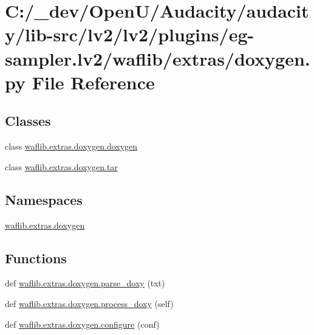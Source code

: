 \hypertarget{lv2_2plugins_2eg-sampler_8lv2_2waflib_2extras_2doxygen_8py}{}\section{C\+:/\+\_\+dev/\+Open\+U/\+Audacity/audacity/lib-\/src/lv2/lv2/plugins/eg-\/sampler.lv2/waflib/extras/doxygen.py File Reference}
\label{lv2_2plugins_2eg-sampler_8lv2_2waflib_2extras_2doxygen_8py}
\subsection*{Classes}
\begin{DoxyCompactItemize}
\item 
class \hyperlink{classwaflib_1_1extras_1_1doxygen_1_1doxygen}{waflib.\+extras.\+doxygen.\+doxygen}
\item 
class \hyperlink{classwaflib_1_1extras_1_1doxygen_1_1tar}{waflib.\+extras.\+doxygen.\+tar}
\end{DoxyCompactItemize}
\subsection*{Namespaces}
\begin{DoxyCompactItemize}
\item 
 \hyperlink{namespacewaflib_1_1extras_1_1doxygen}{waflib.\+extras.\+doxygen}
\end{DoxyCompactItemize}
\subsection*{Functions}
\begin{DoxyCompactItemize}
\item 
def \hyperlink{namespacewaflib_1_1extras_1_1doxygen_ad00d728a0949db6dd441165547e07e7a}{waflib.\+extras.\+doxygen.\+parse\+\_\+doxy} (txt)
\item 
def \hyperlink{namespacewaflib_1_1extras_1_1doxygen_a88b85c6ce6a068c606c3e035e84d8760}{waflib.\+extras.\+doxygen.\+process\+\_\+doxy} (self)
\item 
def \hyperlink{namespacewaflib_1_1extras_1_1doxygen_a172fdeb5aa82f9d3d452b22a5f4abe70}{waflib.\+extras.\+doxygen.\+configure} (conf)
\end{DoxyCompactItemize}
